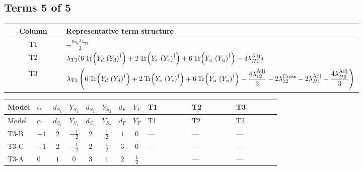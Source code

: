 \documentclass[8pt]{article}
\begin{document}
\begin{landscape}
\subsection*{Terms 5 of 5}
\begin{center}
\begin{tabular}{@{}c >{\raggedright\arraybackslash}p{0.82\linewidth}@{}}
\toprule
Column & Representative term structure \\
\midrule
T1 & \(\displaystyle -\frac{9 {g_Y}^2 {\lambda_{T3}}}{2}\) \\
\midrule
T2 & \(\displaystyle {\lambda_{T3}} (6 \operatorname{Tr}\!\left({Y_d}\,\left({Y_d}\right)^{\dagger}\right)+2 \operatorname{Tr}\!\left({Y_e}\,\left({Y_e}\right)^{\dagger}\right)+6 \operatorname{Tr}\!\left({Y_u}\,\left({Y_u}\right)^{\dagger}\right)-4 {\lambda_{H1}^{\rm Adj}})\) \\
\midrule
T3 & \(\displaystyle {\lambda_{T3}} \left(6 \operatorname{Tr}\!\left({Y_d}\,\left({Y_d}\right)^{\dagger}\right)+2 \operatorname{Tr}\!\left({Y_e}\,\left({Y_e}\right)^{\dagger}\right)+6 \operatorname{Tr}\!\left({Y_u}\,\left({Y_u}\right)^{\dagger}\right)-\frac{4 {\lambda_{12}^{\rm Adj}}}{3}-2 {\lambda_{12}^{\rm Cross}}-2 {\lambda_{H1}^{\rm Adj}}-\frac{4 {\lambda_{H2}^{\rm Adj}}}{3}\right)\) \\
\midrule
\bottomrule
\end{tabular}
\end{center}
\smallskip
\tiny
\begin{longtable}{@{}llcccccc >{\raggedright\arraybackslash}p{0.21\linewidth} >{\raggedright\arraybackslash}p{0.21\linewidth} >{\raggedright\arraybackslash}p{0.21\linewidth}@{}}
\toprule
Model & $\alpha$ & $d_{S_1}$ & $Y_{S_1}$ & $d_{S_2}$ & $Y_{S_2}$ & $d_F$ & $Y_F$ & T1 & T2 & T3 \\
\midrule
\endfirsthead
\toprule
Model & $\alpha$ & $d_{S_1}$ & $Y_{S_1}$ & $d_{S_2}$ & $Y_{S_2}$ & $d_F$ & $Y_F$ & T1 & T2 & T3 \\
\midrule
\endhead
T3-B & $-1$ & $2$ & $-\frac{1}{2}$ & $2$ & $\frac{1}{2}$ & $1$ & $0$ & --- & --- & --- \\
\midrule
T3-C & $-1$ & $2$ & $-\frac{1}{2}$ & $2$ & $\frac{1}{2}$ & $3$ & $0$ & --- & --- & --- \\
\midrule
T3-A & $0$ & $1$ & $0$ & $3$ & $1$ & $2$ & $\frac{1}{2}$ & \scriptsize\adjustbox{max width=\linewidth}{$\begin{gathered} -\frac{9 {g_Y}^2 {\lambda_{T3}}}{2}\end{gathered}$} & --- & --- \\

\end{longtable}
\end{landscape}
\end{document}
